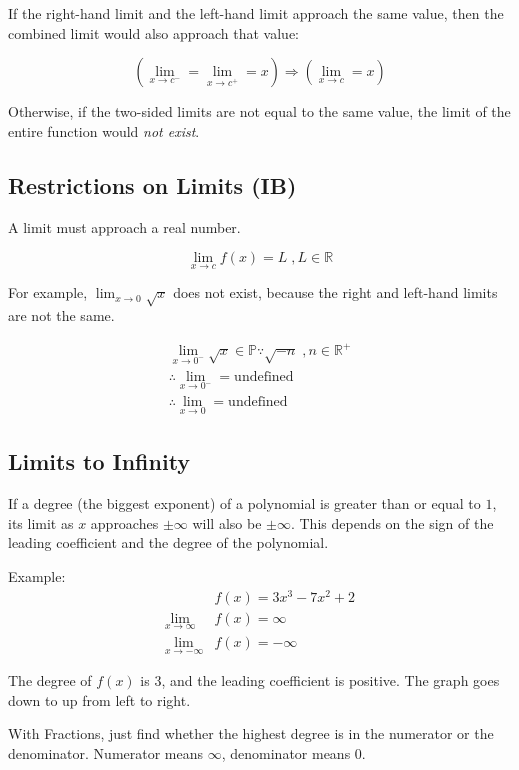 \documentclass[12pt]{article}
\begin{document}
If the right-hand limit and the left-hand limit approach the same value, then the combined limit would also approach that value:

\[ \left( \lim_{x \to c^-} = \lim_{x \to c^+} = x \right) \Rightarrow \left( \lim_{x \to c} = x \right) \]

Otherwise, if the two-sided limits are not equal to the same value, the limit of the entire function would \textit{not exist}.

\subsection{Restrictions on Limits (IB)}

A limit must approach a real number.

\[ \lim_{x \to c} f(x) = L \;, L \in \mathbb{R} \]

For example, $\lim_{x \to 0} \sqrt{x}$ does not exist, because the right and left-hand limits are not the same.

\begin{gather*}
    \lim_{x \to 0^-} \sqrt{x} \in \mathbb{P} \because \sqrt{-n} \;, n \in \mathbb{R}^+ \\
    \therefore \lim_{x \to 0^-} = \text{undefined} \\
    \therefore \lim_{x \to 0} = \text{undefined}
\end{gather*}

\subsection{Limits to Infinity}

If a degree (the biggest exponent) of a polynomial is greater than or equal to $1$, its limit as $x$ approaches $\pm\infty$ will also be $\pm\infty$. This depends on the sign of the leading coefficient and the degree of the polynomial.

\noindent Example:
\begin{align*}
                         & f(x) = 3x^3 - 7x^2 + 2 \\
    \lim_{x \to \infty}  & f(x) = \infty          \\
    \lim_{x \to -\infty} & f(x) = -\infty
\end{align*}

The degree of $f(x)$ is $3$, and the leading coefficient is positive. The graph goes down to up from left to right.

With Fractions, just find whether the highest degree is in the numerator or the denominator. Numerator means $\infty$, denominator means $0$.
\end{document}
